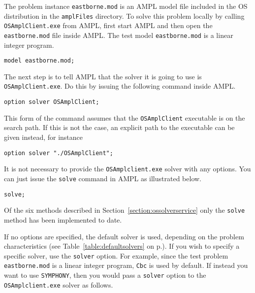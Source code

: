 The  problem instance {\tt eastborne.mod} is an AMPL model file included in the OS distribution 
in the {\tt amplFiles} directory.  To solve this problem locally 
by calling {\tt OSAmplClient.exe} from AMPL, first start AMPL and then open the {\tt eastborne.mod} file 
inside AMPL.  The test model {\tt eastborne.mod} is a linear integer program. 


\begin{verbatim}
model eastborne.mod;
\end{verbatim}

The next step is to tell AMPL that the solver it is going to use is {\tt OSAmplClient.exe}. 
Do this by issuing the following command inside AMPL.

\begin{verbatim}
option solver OSAmplClient;
\end{verbatim}
\ifbible
%
This form of the command assumes that the {\tt OSAmplClient} executable is on the search path. 
If this is not the case, an explicit path to the executable can be given instead, for instance

\begin{verbatim}
option solver "./OSAmplClient";
\end{verbatim}
\fi

It is not necessary to provide the  {\tt OSAmplclient.exe} solver with any options. 
You can just issue the {\tt solve} command in AMPL as illustrated below.  

\begin{verbatim}
solve;
\end{verbatim}

Of the six methods described in Section~\ref{section:ossolverservice} only the {\tt solve} method 
has been implemented to date.

If no options are specified, the default solver is used, depending on the problem characteristics 
(see Table~\ref{table:defaultsolvers} on p.\pageref{table:defaultsolvers}).
If you wish to specify a specific solver, use the {\tt solver} option.   For example,  
since the test problem {\tt eastborne.mod} is a linear integer program, {\tt Cbc} is used by default. 
If instead you want to  use {\tt SYMPHONY},
then you would pass a {\tt solver} option to the {\tt OSAmplclient.exe} solver as follows.%

